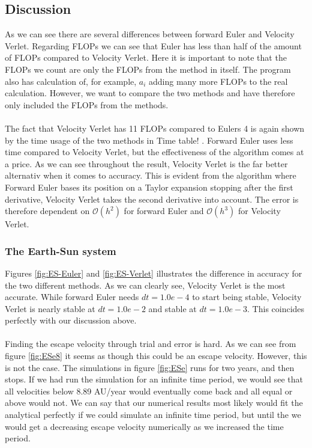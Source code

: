 \documentclass{article}
\newcommand{\husk}[1]{\color{red} #1 \color{black}}
\begin{document}
\subsection{Discussion}
As we can see there are several differences between forward Euler and Velocity Verlet. Regarding FLOPs we can see that Euler has less than half of the amount of FLOPs compared to Velocity Verlet. Here it is important to note that the FLOPs we count are only the FLOPs from the method in itself. The program also has calculation of, for example, $a_i$ adding many more FLOPs to the real calculation. However, we want to compare the two methods and have therefore only included the FLOPs from the methods. \\ \\ 
The fact that Velocity Verlet has 11 FLOPs compared to Eulers 4 is again shown by the time usage of the two methods in \husk{Time table!}. Forward Euler uses less time compared to Velocity Verlet, but the effectiveness of the algorithm comes at a price. As we can see throughout the result, Velocity Verlet is the far better alternativ when it comes to accuracy. This is evident from the algorithm where Forward Euler bases its position on a Taylor expansion stopping after the first derivative, Velocity Verlet takes the second derivative into account. The error is therefore dependent on $\mathcal{O}(h^2)$ for forward Euler and $\mathcal{O}(h^3)$ for Velocity Verlet.
\subsubsection*{The Earth-Sun system}
Figures \ref{fig:ES-Euler} and \ref{fig:ES-Verlet} illustrates the difference in accuracy for the two different methods. As we can clearly see, Velocity Verlet is the most accurate. While forward Euler needs $dt = 1.0e-4$ to start being stable, Velocity Verlet is nearly stable at $dt = 1.0e-2$ and stable at $dt = 1.0e-3$. This coincides perfectly with our discussion above. \\ \\
Finding the escape velocity through trial and error is hard. As we can see from figure \ref{fig:ESe8} it seems as though this could be an escape velocity. However, this is not the case. The simulations in figure \ref{fig:ESe} runs for two years, and then stops. If we had run the simulation for an infinite time period, we would see that all velocities below 8.89 AU/year would eventually come back and all equal or above would not. We can say that our numerical results most likely would fit the analytical perfectly if we could simulate an infinite time period, but until the we would get a decreasing escape velocity numerically as we increased the time period.
\end{document}
